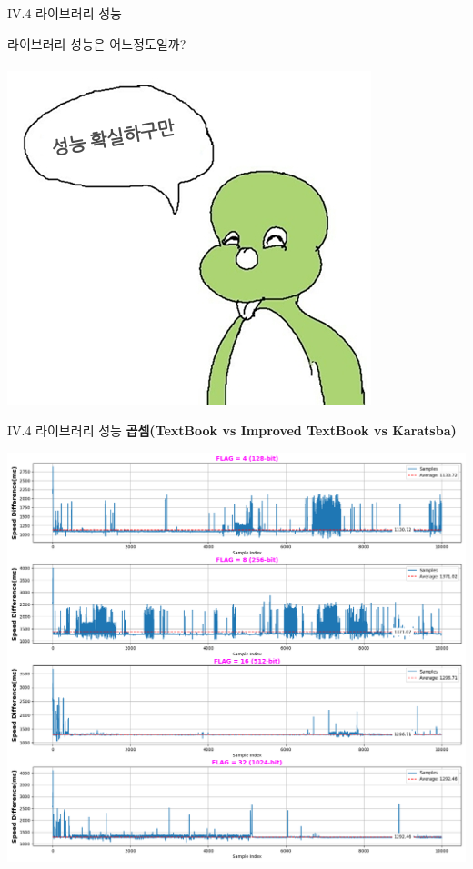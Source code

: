 \documentclass{beamer}
\begin{document}
\begin{frame}{IV.4 라이브러리 성능}
	\begin{center}
		라이브러리 성능은 어느정도일까?\\
		\ \\
		\includegraphics[scale=.5]{lib4_0.png}
	\end{center}
\end{frame}
\begin{frame}{IV.4 라이브러리 성능}
	\alert{\bf 곱셈(TextBook vs Improved TextBook vs Karatsba)}\\
	\begin{center}
		\includegraphics[width=\linewidth,height=.825\textheight]{flag_3072.png}
	\end{center}
\end{frame}
\end{document}
